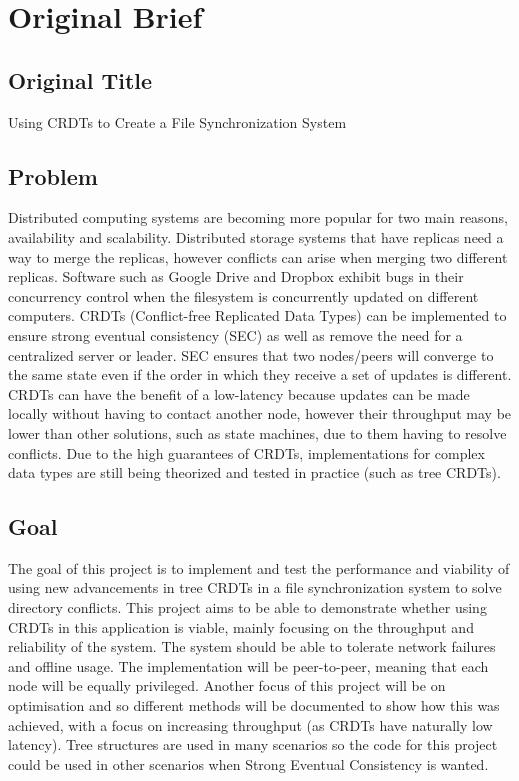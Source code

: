 \documentclass[12pt]{report}
\begin{document}
\clearpage
\printbibliography
\newpage

\appendix
\chapter{Original Brief}
\section{Original Title}
\begin{center}
Using CRDTs to Create a File Synchronization System
\end{center}

\section{Problem}
Distributed computing systems are becoming more popular for two main reasons, availability
and scalability. Distributed storage systems that have replicas need a way to merge the replicas,
however conflicts can arise when merging two different replicas. Software such as Google Drive
and Dropbox exhibit bugs in their concurrency control when the filesystem is concurrently
updated on different computers. CRDTs (Conflict-free Replicated Data Types) can be
implemented to ensure strong eventual consistency (SEC) as well as remove the need for a
centralized server or leader. SEC ensures that two nodes/peers will converge to the same state
even if the order in which they receive a set of updates is different. CRDTs can have the benefit
of a low-latency because updates can be made locally without having to contact another node,
however their throughput may be lower than other solutions, such as state machines, due to
them having to resolve conflicts. Due to the high guarantees of CRDTs, implementations for
complex data types are still being theorized and tested in practice (such as tree CRDTs).

\section{Goal} 
The goal of this project is to implement and test the performance and viability of using new
advancements in tree CRDTs in a file synchronization system to solve directory conflicts. This
project aims to be able to demonstrate whether using CRDTs in this application is viable, mainly
focusing on the throughput and reliability of the system. The system should be able to tolerate
network failures and offline usage. The implementation will be peer-to-peer, meaning that each
node will be equally privileged. Another focus of this project will be on optimisation and so
different methods will be documented to show how this was achieved, with a focus on
increasing throughput (as CRDTs have naturally low latency).
Tree structures are used in many scenarios so the code for this project could be used in other
scenarios when Strong Eventual Consistency is wanted.
\end{document}
